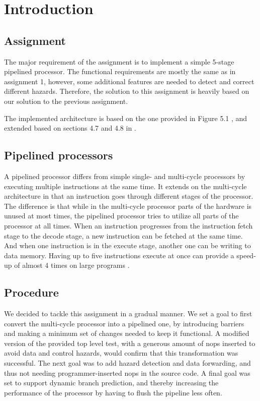 \chapter{Introduction}


\section{Assignment}
The major requirement of the assignment is to implement a simple 5-stage pipelined processor.
The functional requirements are mostly the same as in assignment 1\cite[p.44]{compendium}, however, some additional features are needed to detect and correct different hazards.
Therefore, the solution to this assignment is heavily based on our solution to the previous assignment\cite{report-1}.

The implemented architecture is based on the one provided in Figure 5.1 \cite[p.50]{compendium},
and extended based on sections 4.7 and 4.8 in \cite{thebook}.

\section{Pipelined processors}

A pipelined processor differs from simple single- and multi-cycle processors by executing multiple instructions at the same time.
It extends on the multi-cycle architecture in that an instruction goes through different stages of the processor.
The difference is that while in the multi-cycle processor parts of the hardware is unused at most times, the pipelined processor tries to utilize all parts of the processor at all times.
When an instruction progresses from the instruction fetch stage to the decode stage, a new instruction can be fetched at the same time. And when one instruction is in the execute stage, another one can be writing to data memory.
Having up to five instructions execute at once can provide a speed-up of almost 4 times on large programs \cite[p.276]{thebook}.

\section{Procedure}

We decided to tackle this assignment in a gradual manner.
We set a goal to first convert the multi-cycle processor into a pipelined one, by introducing barriers and making a minimum set of changes needed to keep it functional.
A modified version of the provided top level test, with a generous amount of nops inserted to avoid data and control hazards, would confirm that this transformation was successful.
The next goal was to add hazard detection and data forwarding, and thus not needing programmer-inserted nops in the source code.
A final goal was set to support dynamic branch prediction, and thereby increasing the performance of the processor by having to flush the pipeline less often.

